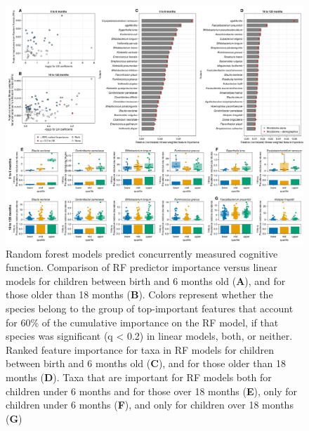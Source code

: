 \documentclass{article}
\begin{document}
\begin{figure}
    \centering
    \includegraphics[width=\textwidth]{assets/Figure3.png}
    \caption{
        Random forest models predict concurrently measured cognitive function.
        Comparison of RF predictor importance versus linear models for children
        between birth and 6 months old (\textbf{A}), and for those older than 18 months
        (\textbf{B}). Colors represent whether the species belong to the group of
        top-important features that account for 60\% of the cumulative
        importance on the RF model, if that species was significant (q
        \textless{} 0.2) in linear models, both, or neither. Ranked feature
        importance for taxa in RF models for children between birth and 6 months
        old (\textbf{C}), and for those older than 18 months (\textbf{D}). Taxa that are important
        for RF models both for children under 6 months and for those over 18
        months (\textbf{E}), only for children under 6 months (\textbf{F}), and only for children
        over 18 months (\textbf{G})
    }
    \label{fig:3}
\end{figure}
\end{document}
